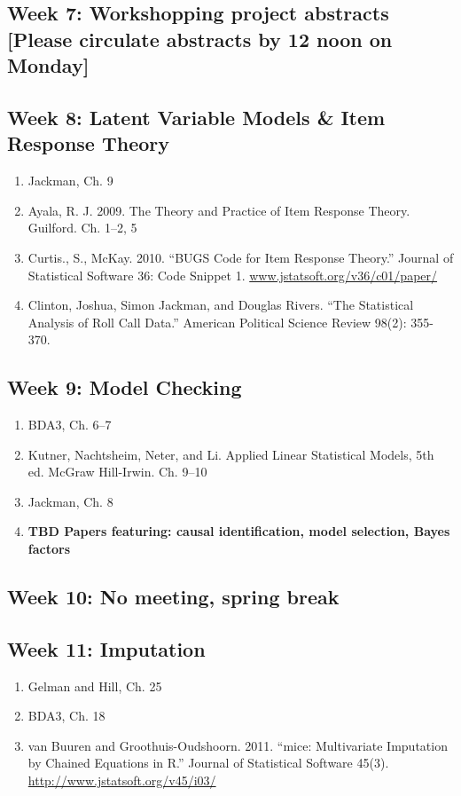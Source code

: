 \documentclass[11pt, leqno, fleqn]{article}
\begin{document}
\subsection*{Week 7: Workshopping project abstracts [Please circulate abstracts by 12 noon on Monday]}
\subsection*{Week 8: Latent Variable Models \& Item Response Theory}
	\begin{enumerate}
	\item[] Jackman, Ch. 9
	\item[] Ayala, R. J. 2009. The Theory and Practice of Item Response Theory. Guilford. Ch. 1--2, 5
	\item[] Curtis., S., McKay. 2010. ``BUGS Code for Item Response Theory.'' Journal of
Statistical Software 36: Code Snippet 1. \url{
www.jstatsoft.org/v36/c01/paper/}
	\item[] Clinton, Joshua, Simon Jackman, and Douglas Rivers. ``The Statistical Analysis
of Roll Call Data.'' American Political Science Review 98(2): 355-370.
	\end{enumerate}
\subsection*{Week 9: Model Checking}
	\begin{enumerate}
	\item[] BDA3, Ch. 6--7
	\item[] Kutner, Nachtsheim, Neter, and Li. Applied Linear Statistical Models, 5th ed.
McGraw Hill-Irwin. Ch. 9--10
	\item[] Jackman, Ch. 8
	\item[] {\bf TBD Papers featuring: causal identification, model selection, Bayes factors }
	\end{enumerate}
\subsection*{Week 10: No meeting, spring break}
\subsection*{Week 11: Imputation}
	\begin{enumerate}
	\item[] Gelman and Hill, Ch. 25
	\item[] BDA3, Ch. 18
	\item[] van Buuren and Groothuis-Oudshoorn. 2011. ``mice: Multivariate Imputation
by Chained Equations in R.'' Journal of Statistical Software 45(3). \url{http://www.jstatsoft.org/v45/i03/}
	\end{enumerate}
\end{document}
